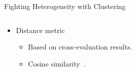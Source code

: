 
\begin{frame}{Fighting Heterogeneity with Clustering}
    \begin{columns}
        \begin{column}{.5\textwidth}
        \begin{itemize}
                \item Distance metric
                \begin{itemize}
                    \item Based on \alert{cross-evaluation} results. 
                    \item \alert{Cosine similarity}~\cite{briggs_Federatedlearninghierarchical_2020}.
                \end{itemize}
        \end{itemize}
        \end{column}
\end{columns}
\end{frame}
